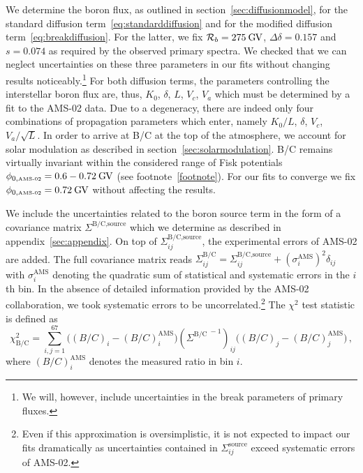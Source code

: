 \documentclass[a4paper,11pt]{article}
\newcommand{\eVdist}{\kern-0.06em}
\newcommand{\gv}{\:\text{G\eVdist V}}
\begin{document}
We determine the boron flux, as outlined in section~\ref{sec:diffusionmodel}, for the standard diffusion term~\eqref{eq:standarddiffusion} and for the modified diffusion term~\eqref{eq:breakdiffusion}. For the latter, we fix $\mathcal{R}_b=275\gv$, $\Delta\delta=0.157$ and $s=0.074$ as required by the observed primary spectra. We checked that we can neglect uncertainties on these three parameters in our fits without changing results noticeably.\footnote{We will, however, include uncertainties in the break parameters of primary fluxes.} For both diffusion terms, the parameters controlling the interstellar boron flux are, thus, $K_0$, $\delta$, $L$, $V_c$, $V_a$ which must be determined by a fit to the AMS-02 data. Due to a degeneracy, there are indeed only four combinations of propagation parameters which enter, namely $K_0/L$, $\delta$, $V_c$, $V_a/\sqrt{L}$. In order to arrive at B/C at the top of the atmosphere, we account for solar modulation as described in section~\ref{sec:solarmodulation}. B/C remains virtually invariant within the considered range of Fisk potentials $\phi_{0,\text{\tiny{AMS-02}}}=0.6-0.72\gv$ (see footnote~\ref{footnote}). For our fits to converge we fix $\phi_{0,\text{\tiny{AMS-02}}}=0.72\gv$ without affecting the results.

We include the uncertainties related to the boron source term in the form of a covariance matrix $\Sigma^\text{B/C,source}$ which we determine as described in appendix~\ref{sec:appendix}. On top of $\Sigma_{ij}^\text{B/C,source}$, the experimental errors of AMS-02 are added. The full covariance matrix reads $
\Sigma_{ij}^\text{B/C} = \Sigma_{ij}^\text{B/C,source} + \left(\sigma_i^{\text{AMS}} \right)^2\delta_{ij}
$
with $\sigma_i^\text{AMS}$ denoting the quadratic sum of statistical and systematic errors in the $i$th bin. In the absence of detailed information provided by the AMS-02 collaboration, we took systematic errors to be uncorrelated.\footnote{Even if this approximation is oversimplistic, it is not expected to impact our fits dramatically as uncertainties contained in $\Sigma_{ij}^\text{source}$ exceed systematic errors of AMS-02.} The $\chi^2$ test statistic is defined as
\begin{equation}\label{eq:chibc}
 \chi^2_{\text{B/C}} = \sum\limits_{i,j=1}^{67} \Big((B/C)_i - (B/C)_{i}^{\text{AMS}}\Big)  \left({\Sigma^\text{B/C}}^{\:-1}\right)_{ij} \Big((B/C)_j - (B/C)_{j}^{\text{AMS}}\Big)\,,
\end{equation}
where $(B/C)_{i}^{\text{AMS}}$ denotes the measured ratio in bin $i$.
\end{document}

